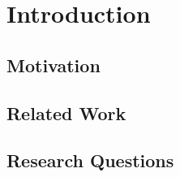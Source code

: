 \chapter{Introduction} \label{chap:introduction}


\section{Motivation} \label{chap:introduction:motivation}


\section{Related Work} \label{chap:introduction:related_work}


\section{Research Questions} \label{chap:introduction:research_questions}
